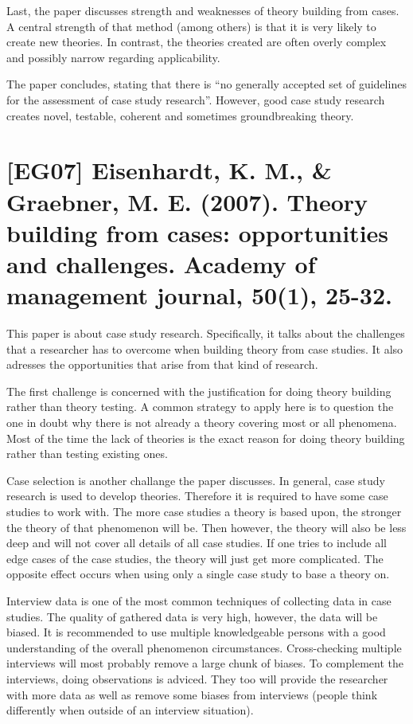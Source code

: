 \documentclass[a4paper,12pt,english]{scrartcl}
\newcommand{\papertitle}[2]{
	\section{[#1] #2}
}
\begin{document}
Last, the paper discusses strength and weaknesses of theory building from cases. A central strength of that method (among others) is that it is very likely to create new theories. In contrast, the theories created are often overly complex and possibly narrow regarding applicability.

The paper concludes, stating that there is \enquote{no generally accepted set of guidelines for the assessment of case study research}. However, good case study research creates novel, testable, coherent and sometimes groundbreaking theory.
\newpage

\papertitle{EG07}{Eisenhardt, K. M., \& Graebner, M. E. (2007). Theory building from cases: opportunities and challenges. Academy of management journal, 50(1), 25-32.}

This paper is about case study research. Specifically, it talks about the challenges that a researcher has to overcome when building theory from case studies. It also adresses the opportunities that arise from that kind of research.

The first challenge is concerned with the justification for doing theory building rather than theory testing. A common strategy to apply here is to question the one in doubt why there is not already a theory covering most or all phenomena. Most of the time the lack of theories is the exact reason for doing theory building rather than testing existing ones.

Case selection is another challange the paper discusses. In general, case study research is used to develop theories. Therefore it is required to have some case studies to work with. The more case studies a theory is based upon, the stronger the theory of that phenomenon will be. Then however, the theory will also be less deep and will not cover all details of all case studies. If one tries to include all edge cases of the case studies, the theory will just get more complicated. The opposite effect occurs when using only a single case study to base a theory on.

Interview data is one of the most common techniques of collecting data in case studies. The quality of gathered data is very high, however, the data will be biased. It is recommended to use multiple knowledgeable persons with a good understanding of the overall phenomenon circumstances. Cross-checking multiple interviews will most probably remove a large chunk of biases. To complement the interviews, doing observations is adviced. They too will provide the researcher with more data as well as remove some biases from interviews (people think differently when outside of an interview situation).
\end{document}
